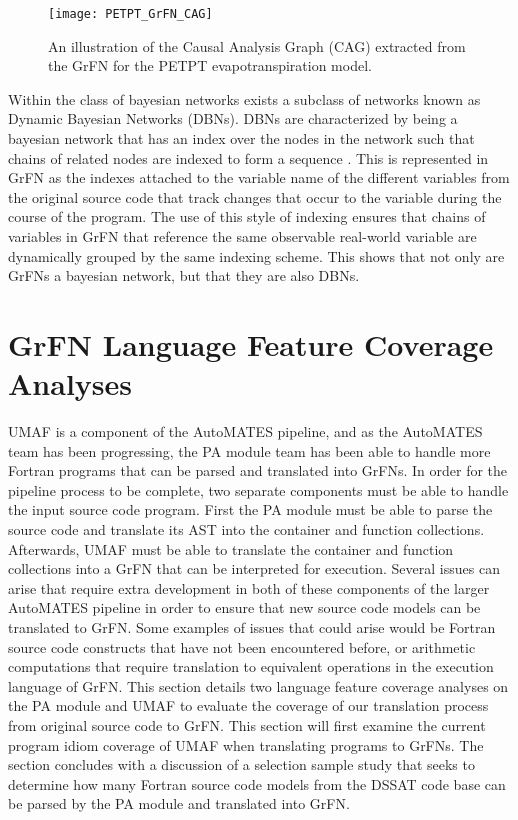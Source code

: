 \begin{figure}[!tbp]
  \centering
  \texttt{[image: PETPT\_GrFN\_CAG]}
  \caption[PETPT GrFN Causal Analysis Graph]{An illustration of the Causal Analysis Graph (CAG) extracted from the GrFN for the PETPT evapotranspiration model.}
  \label{fig:petpt_cag}
\end{figure}

Within the class of bayesian networks exists a subclass of networks known as Dynamic Bayesian Networks (DBNs).
DBNs are characterized by being a bayesian network that has an index over the nodes in the network such that chains of related nodes are indexed to form a sequence \citep{pearl2009causality}.
This is represented in GrFN as the indexes attached to the variable name of the different variables from the original source code that track changes that occur to the variable during the course of the program.
The use of this style of indexing ensures that chains of variables in GrFN that reference the same observable real-world variable are dynamically grouped by the same indexing scheme.
This shows that not only are GrFNs a bayesian network, but that they are also DBNs.

\section{GrFN Language Feature Coverage Analyses\label{sec:grfn_eval}}
UMAF is a component of the AutoMATES pipeline, and as the AutoMATES team has been progressing, the PA module team has been able to handle more Fortran programs that can be parsed and translated into GrFNs.
In order for the pipeline process to be complete, two separate components must be able to handle the input source code program.
First the PA module must be able to parse the source code and translate its AST into the container and function collections.
Afterwards, UMAF must be able to translate the container and function collections into a GrFN that can be interpreted for execution.
Several issues can arise that require extra development in both of these components of the larger AutoMATES pipeline in order to ensure that new source code models can be translated to GrFN.
Some examples of issues that could arise would be Fortran source code constructs that have not been encountered before, or arithmetic computations that require translation to equivalent operations in the execution language of GrFN.
This section details two language feature coverage analyses on the PA module and UMAF to evaluate the coverage of our translation process from original source code to GrFN.
This section will first examine the current program idiom coverage of UMAF when translating programs to GrFNs.
The section concludes with a discussion of a selection sample study that seeks to determine how many Fortran source code models from the DSSAT code base can be parsed by the PA module and translated into GrFN.

